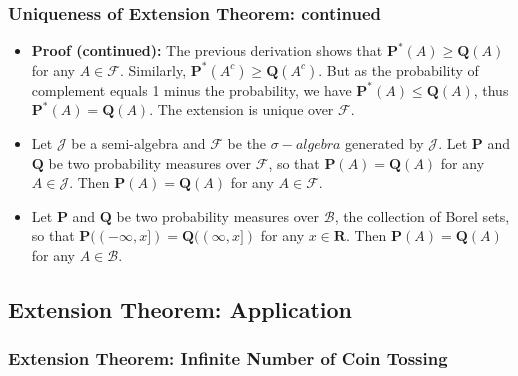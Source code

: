 \documentclass[handout]{beamer}
\newcommand{\BP}{\mathbf{P}}
\begin{document}
\frame
{
  \frametitle{Uniqueness of Extension Theorem: continued}

   \begin{itemize}
     
    
            \item<1->\textbf{Proof (continued):} The previous derivation shows that $ \BP^*(A)\geq \mathbf{Q} (A)$ for any $A\in\mathcal{F}$. Similarly, $ \BP^*(A^c)\geq \mathbf{Q} (A^c)$. But as the probability of complement equals 1 minus the probability, we have $ \BP^*(A)\leq \mathbf{Q} (A)$, thus  $ \BP^*(A)= \mathbf{Q} (A)$. The extension is unique over $\mathcal{F}.$
            
                   
    \item<2->[]    \begin{Corollary}[Proposition 2.5.8] Let $\mathcal{J}$ be a semi-algebra and $\mathcal{F}$ be the $\sigma-algebra$ generated by  $\mathcal{J}$. Let $\mathbf{P}$ and $\mathbf{Q}$ be two probability measures over $\mathcal{F}$, so that $\mathbf{P}(A)=\mathbf{Q} (A)$ for any $A\in\mathcal{J}$. Then $\mathbf{P}(A)=\mathbf{Q} (A)$ for any $A\in\mathcal{F}$. 
                
            \end{Corollary}    
                 
                     \item<3->[]    \begin{Corollary}[2.5.9] Let $\mathbf{P}$ and $\mathbf{Q}$ be two probability measures over $\mathcal{B}$,  the collection of Borel sets, so that $\mathbf{P}((-\infty, x])=\mathbf{Q} ((\infty,x])$ for any $x\in \mathbf{R}$. Then $\mathbf{P}(A)=\mathbf{Q} (A)$ for any $A\in\mathcal{B}$. 
                
            \end{Corollary}    
                   \end{itemize}

}


\subsection{Extension Theorem: Application}

\subsubsection{Extension Theorem: Infinite Number of Coin Tossing}
\end{document}
